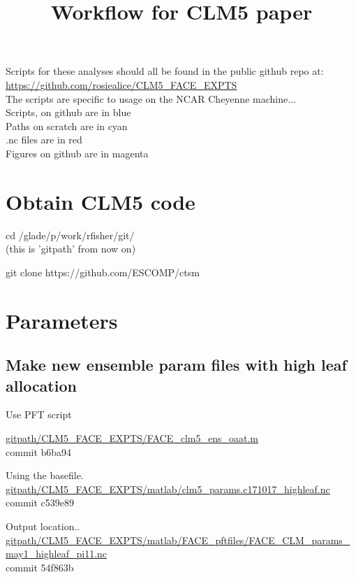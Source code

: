 \documentclass{article}
\begin{document}
\title{Workflow for CLM5 paper}
\maketitle{}

Scripts for these analyses should all be found in the public github repo at:\\
{\color{blue}\small{\url{https://github.com/rosiealice/CLM5_FACE_EXPTS}}}\\

The scripts are specific to usage on the NCAR Cheyenne machine...\\

{\color{blue} Scripts, on github are in blue}\\
{\color{cyan} Paths on scratch are in cyan}\\
{\color{red}  .nc files are in red}\\
{\color{magenta} Figures on github are in magenta}\\

\section{Obtain CLM5 code}
cd /glade/p/work/rfisher/git/\\
(this is 'gitpath' from now on)

git clone https://github.com/ESCOMP/ctsm 
\section{Parameters}


\subsection{Make new ensemble param files with high leaf allocation }

Use PFT script

{\color{blue}\small{\url{gitpath/CLM5_FACE_EXPTS/FACE_clm5_ens_oaat.m}}}\\ 
commit b6ba94

Using the basefile. \\
{\color{red}\small{\url{gitpath/CLM5_FACE_EXPTS/matlab/clm5_params.c171017_highleaf.nc}}} \\
commit c539e89


Output location..\\
{\color{red}\small{\url{gitpath/CLM5_FACE_EXPTS/matlab/FACE_pftfiles/FACE_CLM_params_may1_highleaf_pi11.nc }}} \\
commit 54f863b
\end{document}
